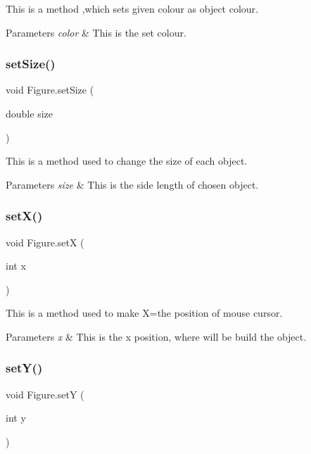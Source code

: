 This is a method ,which sets given colour as object colour. 
\begin{DoxyParams}{Parameters}
{\em color} & This is the set colour. \\
\hline
\end{DoxyParams}
\mbox{\label{class_figure_a559fabea6b75d3f0bcfd95aef5149823}} 
\subsubsection{\texorpdfstring{setSize()}{setSize()}}
{\footnotesize\ttfamily void Figure.\+set\+Size (\begin{DoxyParamCaption}\item[{double}]{size }\end{DoxyParamCaption})}

This is a method used to change the size of each object. 
\begin{DoxyParams}{Parameters}
{\em size} & This is the side length of chosen object. \\
\hline
\end{DoxyParams}
\mbox{\label{class_figure_a7cd86e9fc5326d26fbb007f849ca5dc0}} 
\subsubsection{\texorpdfstring{setX()}{setX()}}
{\footnotesize\ttfamily void Figure.\+setX (\begin{DoxyParamCaption}\item[{int}]{x }\end{DoxyParamCaption})}

This is a method used to make X=the position of mouse cursor. 
\begin{DoxyParams}{Parameters}
{\em x} & This is the x position, where will be build the object. \\
\hline
\end{DoxyParams}
\mbox{\label{class_figure_a8157494a31103df133ebf92d5f60cb0e}} 
\subsubsection{\texorpdfstring{setY()}{setY()}}
{\footnotesize\ttfamily void Figure.\+setY (\begin{DoxyParamCaption}\item[{int}]{y }\end{DoxyParamCaption})}

